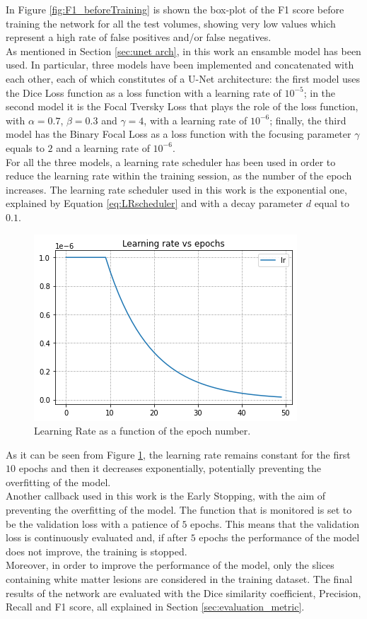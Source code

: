 \documentclass[12pt]{extarticle}
\begin{document}
\noindent In Figure \ref{fig:F1_beforeTraining} is shown the box-plot of the F1 score before training the network for all the test volumes, showing very low values which represent a high rate of false positives and/or false negatives.\\[4pt]
As mentioned in Section \ref{sec:unet arch}, in this work an ensamble model has been used. In particular, three models have been implemented and concatenated with each other, each of which constitutes of a U-Net architecture: the first model uses the Dice Loss function as a loss function with a learning rate of $10^{-5}$; in the second model it is the Focal Tversky Loss that plays the role of the loss function, with $\alpha = 0.7$, $\beta = 0.3$ and $\gamma = 4$, with a learning rate of $10^{-6}$; finally, the third model has the Binary Focal Loss as a loss function with the focusing parameter $\gamma$ equals to $2$ and a learning rate of $10^{-6}$.\\
For all the three models, a learning rate scheduler has been used in order to reduce the learning rate within the training session, as the number of the epoch increases. The learning rate scheduler used in this work is the exponential one, explained by Equation \eqref{eq:LRscheduler} and with a decay parameter $d$ equal to $0.1$.
\begin{figure}[h!]
\centering
\includegraphics[scale = 0.8]{LR.png}
\caption{Learning Rate as a function of the epoch number.}
\label{fig:LR}
\end{figure}
As it can be seen from Figure \ref{fig:LR}, the learning rate remains constant for the first $10$ epochs and then it decreases exponentially, potentially preventing the overfitting of the model.\\[4pt]
Another callback used in this work is the Early Stopping, with the aim of preventing the overfitting of the model. The function that is monitored is set to be the validation loss with a patience of $5$ epochs. This means that the validation loss is continuously evaluated and, if after $5$ epochs the performance of the model does not improve, the training is stopped.\\[4pt]
Moreover, in order to improve the performance of the model, only the slices containing white matter lesions are considered in the training dataset. The final results of the network are evaluated with the Dice similarity coefficient, Precision, Recall and F1 score, all explained in Section \ref{sec:evaluation_metric}. 
\end{document}
